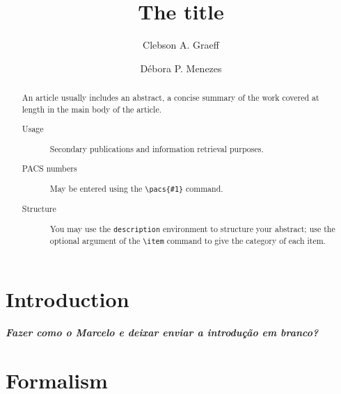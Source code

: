 \documentclass[prc, reprint, amsmath, floatfix, linenumbers,10pt]{revtex4-1}
\newcommand{\comment}[1]{{\bf\textit{#1}}}
\begin{document}

%
%

\title{The title}

\author{Clebson A. Graeff}

\author{Débora P. Menezes}


\begin{abstract}
An article usually includes an abstract, a concise summary of the work
covered at length in the main body of the article. 
\begin{description}
\item[Usage]
Secondary publications and information retrieval purposes.
\item[PACS numbers]
May be entered using the \verb+\pacs{#1}+ command.
\item[Structure]
You may use the \texttt{description} environment to structure your abstract;
use the optional argument of the \verb+\item+ command to give the category of each item. 
\end{description}
\end{abstract}




\maketitle

%
%

\section{Introduction}

\comment{Fazer como o Marcelo e deixar enviar a introdução em branco?}

\section{Formalism}
\end{document}
